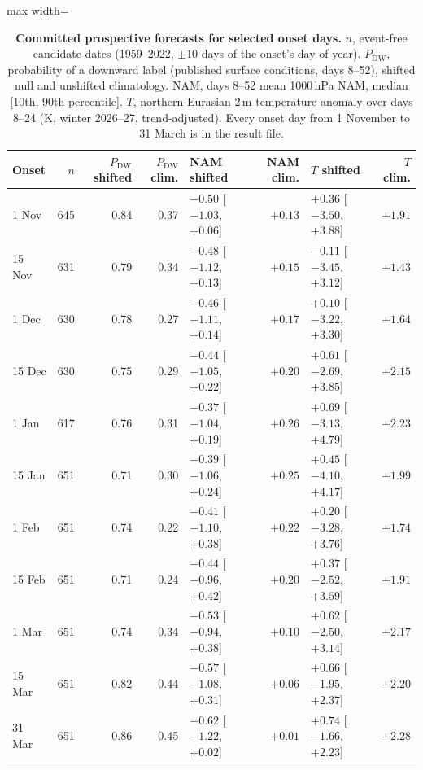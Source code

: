\documentclass[11pt]{article}
\begin{document}
\begin{table}[h]
\centering
\caption{\textbf{Committed prospective forecasts for selected onset days.} $n$, event-free candidate dates (1959--2022, $\pm10$ days of the onset's day of year). $P_\mathrm{DW}$, probability of a downward label (published surface conditions, days 8--52), shifted null and unshifted climatology. NAM, days 8--52 mean 1000\,hPa NAM, median [10th, 90th percentile]. $T$, northern-Eurasian 2\,m temperature anomaly over days 8--24 (K, winter 2026--27, trend-adjusted). Every onset day from 1 November to 31 March is in the result file.}\label{tab:pro}
{\small\begin{adjustbox}{max width=\textwidth}
\begin{tabular}{@{}lrrrlrlr@{}}
\toprule
Onset & $n$ & $P_\mathrm{DW}$ shifted & $P_\mathrm{DW}$ clim. & NAM shifted & NAM clim. & $T$ shifted & $T$ clim. \\
\midrule
1 Nov & 645 & 0.84 & 0.37 & $-0.50$ [$-1.03$, $+0.06$] & $+0.13$ & $+0.36$ [$-3.50$, $+3.88$] & $+1.91$ \\
15 Nov & 631 & 0.79 & 0.34 & $-0.48$ [$-1.12$, $+0.13$] & $+0.15$ & $-0.11$ [$-3.45$, $+3.12$] & $+1.43$ \\
1 Dec & 630 & 0.78 & 0.27 & $-0.46$ [$-1.11$, $+0.14$] & $+0.17$ & $+0.10$ [$-3.22$, $+3.30$] & $+1.64$ \\
15 Dec & 630 & 0.75 & 0.29 & $-0.44$ [$-1.05$, $+0.22$] & $+0.20$ & $+0.61$ [$-2.69$, $+3.85$] & $+2.15$ \\
1 Jan & 617 & 0.76 & 0.31 & $-0.37$ [$-1.04$, $+0.19$] & $+0.26$ & $+0.69$ [$-3.13$, $+4.79$] & $+2.23$ \\
15 Jan & 651 & 0.71 & 0.30 & $-0.39$ [$-1.06$, $+0.24$] & $+0.25$ & $+0.45$ [$-4.10$, $+4.17$] & $+1.99$ \\
1 Feb & 651 & 0.74 & 0.22 & $-0.41$ [$-1.10$, $+0.38$] & $+0.22$ & $+0.20$ [$-3.28$, $+3.76$] & $+1.74$ \\
15 Feb & 651 & 0.71 & 0.24 & $-0.44$ [$-0.96$, $+0.42$] & $+0.20$ & $+0.37$ [$-2.52$, $+3.59$] & $+1.91$ \\
1 Mar & 651 & 0.74 & 0.34 & $-0.53$ [$-0.94$, $+0.38$] & $+0.10$ & $+0.62$ [$-2.50$, $+3.14$] & $+2.17$ \\
15 Mar & 651 & 0.82 & 0.44 & $-0.57$ [$-1.08$, $+0.31$] & $+0.06$ & $+0.66$ [$-1.95$, $+2.37$] & $+2.20$ \\
31 Mar & 651 & 0.86 & 0.45 & $-0.62$ [$-1.22$, $+0.02$] & $+0.01$ & $+0.74$ [$-1.66$, $+2.23$] & $+2.28$ \\
\bottomrule
\end{tabular}\end{adjustbox}}
\end{table}
\end{document}
